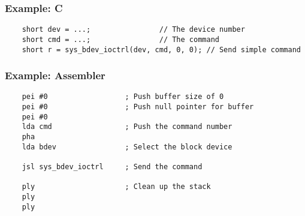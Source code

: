 \subsubsection*{Example: C}
\begin{lstlisting}
    short dev = ...;                // The device number
    short cmd = ...;                // The command
    short r = sys_bdev_ioctrl(dev, cmd, 0, 0); // Send simple command
\end{lstlisting}

\subsubsection*{Example: Assembler}
\begin{verbatim}
    pei #0                  ; Push buffer size of 0
    pei #0                  ; Push null pointer for buffer
    pei #0
    lda cmd                 ; Push the command number
    pha
    lda bdev                ; Select the block device
    
    jsl sys_bdev_ioctrl     ; Send the command

    ply                     ; Clean up the stack
    ply
    ply
\end{verbatim}